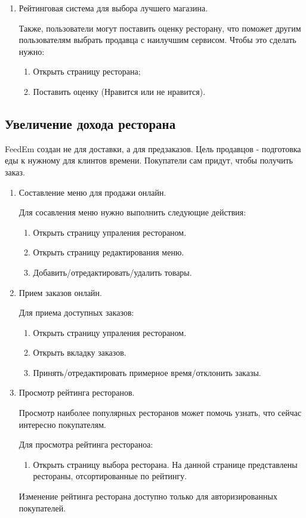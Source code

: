 {{\begin{enumerate}
  \item {
    Рейтинговая система для выбора лучшего магазина.

    Также, пользователи могут поставить оценку ресторану, что поможет другим пользователям выбрать продавца с наилучшим сервисом. Чтобы это сделать нужно:

    \begin{enumerate}[label*=\arabic*.]
      \item Открыть страницу ресторана;
      \item Поставить оценку (Нравится или не нравится).
    \end{enumerate}
  }
\end{enumerate}
}

\subsection{Увеличение дохода ресторана}
{
  FeedEm создан не для доставки, а для предзаказов. Цель продавцов - подготовка еды к нужному для клинтов времени. Покупатели сам придут, чтобы получить заказ.

  \begin{enumerate}
    \item {
      Составление меню для продажи онлайн.

      Для сосавления меню нужно выполнить следующие действия:

      \begin{enumerate}[label*=\arabic*.]
        \item Открыть страницу упраления рестораном.
        \item Открыть страницу редактирования меню.
        \item Добавить/отредактировать/удалить товары.
      \end{enumerate}
    }
    \item {
      Прием заказов онлайн.

      Для приема доступных заказов:

      \begin{enumerate}[label*=\arabic*.]
        \item Открыть страницу упраления рестораном.
        \item Открыть вкладку заказов.
        \item Принять/отредактировать примерное время/отклонить заказы.
      \end{enumerate}
    }
    \item {
      Просмотр рейтинга ресторанов.

      Просмотр наиболее популярных ресторанов может помочь узнать, что сейчас интересно покупателям.

      Для просмотра рейтинга рестораноа:

      \begin{enumerate}[label*=\arabic*.]
        \item Открыть страницу выбора ресторана. На данной странице представлены рестораны, отсортированные по рейтингу.
      \end{enumerate}

      Изменение рейтинга ресторана доступно только для авторизированных покупателей.
    }
  \end{enumerate}
}
}
